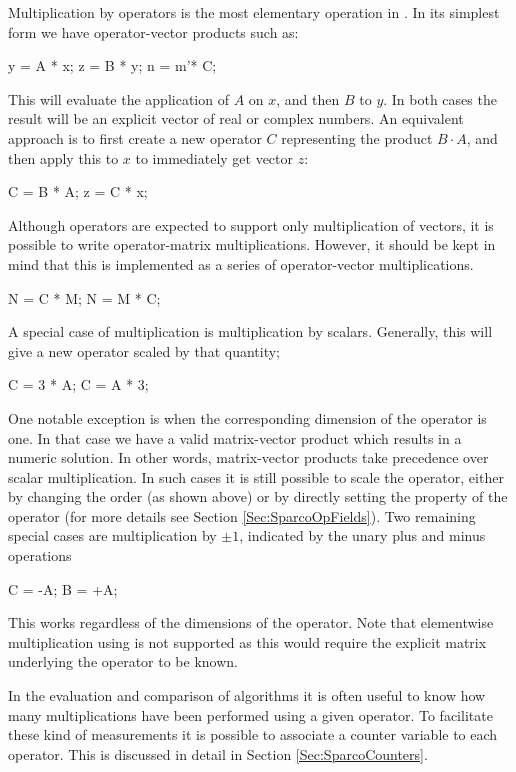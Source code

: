 Multiplication by operators is the most elementary operation in
\sparco. In its simplest form we have operator-vector products such
as:
\begin{codeblock}
y = A * x;
z = B * y;
n = m'* C;  %
\end{codeblock}
This will evaluate the application of $A$ on $x$, and then $B$ to
$y$. In both cases the result will be an explicit vector of real or
complex numbers. An equivalent approach is to first create a new
operator $C$ representing the product $B\cdot A$, and then apply this
to $x$ to immediately get vector $z$:
\begin{codeblock}
C = B * A;  %
z = C * x;  %
\end{codeblock}
Although \sparco{} operators are expected to support only
multiplication of vectors, it is possible to write operator-matrix
multiplications. However, it should be kept in mind that this is
implemented as a series of operator-vector multiplications.
\begin{codeblock}
N = C * M;
N = M * C;  %
\end{codeblock}
A special case of multiplication is multiplication by
scalars. Generally, this will give a new operator scaled by that
quantity;
\begin{codeblock}
C = 3 * A;  %
C = A * 3;
\end{codeblock}
One notable exception is when the corresponding dimension of the
operator is one. In that case we have a valid matrix-vector product
which results in a numeric solution. In other words, matrix-vector
products take precedence over scalar multiplication. In such cases it
is still possible to scale the operator, either by changing the order
(as shown above) or by directly setting the  property
of the operator (for more details see Section \ref{Sec:SparcoOpFields}).
Two remaining special cases are multiplication by $\pm 1$, indicated
by the unary plus and minus operations
\begin{codeblock}
C = -A;
B = +A;
\end{codeblock}
This works regardless of the dimensions of the operator. Note that
elementwise multiplication using  is not supported as this
would require the explicit matrix underlying the operator to be known.

In the evaluation and comparison of algorithms it is often useful to
know how many multiplications have been performed using a given
operator. To facilitate these kind of measurements it is possible to
associate a counter variable to each operator. This is discussed in
detail in Section \ref{Sec:SparcoCounters}.

